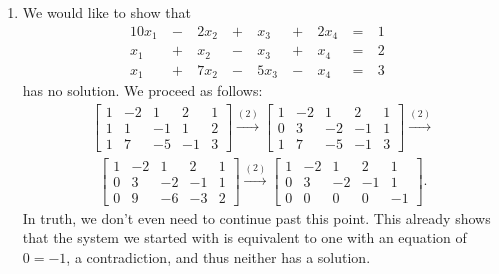 \documentclass[12pt]{article}
\begin{document}
\begin{enumerate}
  \item
    We would like to show that
    \begin{alignat*}{10}
      x_1\ &-&\ 2x_2\ &+&\ x_3\  &+&\ 2x_4\ &=&\ 1&\\
      x_1\ &+&\ x_2\  &-&\ x_3\  &+&\ x_4\  &=&\ 2&\\
      x_1\ &+&\ 7x_2\ &-&\ 5x_3\ &-&\ x_4\  &=&\ 3&
    \end{alignat*}
    has no solution.
    We proceed as follows:
    \begin{align*}
      \begin{bmatrix}
        1 & -2 & 1  & 2  & 1\\
        1 & 1  & -1 & 1  & 2\\
        1 & 7  & -5 & -1 & 3
      \end{bmatrix}
      \xrightarrow{(2)}
      \begin{bmatrix}
        1 & -2 & 1  & 2  & 1\\
        0 & 3  & -2 & -1 & 1\\
        1 & 7  & -5 & -1 & 3
      \end{bmatrix}
      \xrightarrow{(2)}
    \end{align*}
    \begin{align*}
      \begin{bmatrix}
        1 & -2 & 1  & 2  & 1\\
        0 & 3  & -2 & -1 & 1\\
        0 & 9  & -6 & -3 & 2
      \end{bmatrix}
      \xrightarrow{(2)}
      \begin{bmatrix}
        1 & -2 & 1  & 2  & 1\\
        0 & 3  & -2 & -1 & 1\\
        0 & 0  & 0  & 0  & -1
      \end{bmatrix}.
    \end{align*}
    In truth, we don't even need to continue past this point.
    This already shows that the system we started with is
    equivalent to one with an equation of $0 = -1$, a
    contradiction, and thus neither has a solution.


\end{enumerate}
\end{document}
